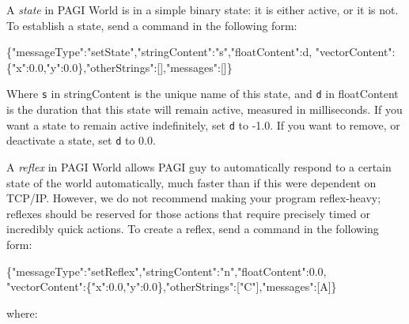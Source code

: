 A \textit{state} in PAGI World is in a simple binary state: it is either active, or it is not. To establish a state, send a command in the following form:
\begin{center}
	\scriptsize{\{"messageType":"setState","stringContent":"s","floatContent":d, "vectorContent":\{"x":0.0,"y":0.0\},"otherStrings":[],"messages":[]\}}
\end{center}
 Where \texttt{s} in stringContent is the unique name of this state, and \texttt{d} in floatContent is the duration that this state will remain active, measured in milliseconds. If you want a state to remain active indefinitely, set \texttt{d} to -1.0. If you want to remove, or deactivate a state, set \texttt{d} to 0.0.

A \textit{reflex} in PAGI World allows PAGI guy to automatically respond to a certain state of the world automatically, much faster than if this were dependent on TCP/IP. However, we do not recommend making your program reflex-heavy; reflexes should be reserved for those actions that require precisely timed or incredibly quick actions. To create a reflex, send a command in the following form:
\begin{center}
	\scriptsize{\{"messageType":"setReflex","stringContent":"n","floatContent":0.0, "vectorContent":\{"x":0.0,"y":0.0\},"otherStrings":["C"],"messages":[A]\}}
\end{center}
 where:

